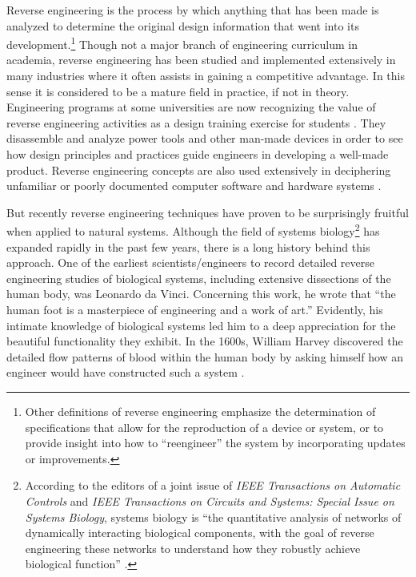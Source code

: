Reverse engineering is the process by which anything that has been made
is analyzed to determine the original design information that went into
its development.\footnote{%
Other definitions of reverse engineering emphasize
the determination of specifications that allow for the reproduction of
a device or system, or to provide insight into how to “reengineer” the
system by incorporating updates or improvements.
} Though not a major branch of
engineering curriculum in academia, reverse engineering has been
studied and implemented extensively in many industries where it often
assists in gaining a competitive advantage. In this sense it is
considered to be a mature field in practice, if not in theory.
Engineering programs at some universities are now recognizing the value
of reverse engineering activities as a design training exercise for
students \citep[][pp. 57--59]{wu2008}.
They disassemble and analyze power tools
and other man-made devices in order to see how design principles and
practices guide engineers in developing a well-made product. Reverse
engineering concepts are also used extensively in deciphering
unfamiliar or poorly documented computer software and hardware
systems \citep{eilam2005}.

But recently reverse engineering techniques have proven to be
surprisingly fruitful when applied to natural systems. Although the
field of systems biology\footnote{%
According to the editors of a joint issue of
\textit{IEEE Transactions on Automatic Controls} and \textit{IEEE
Transactions on Circuits and Systems: Special Issue on Systems Biology}, 
systems biology is “the quantitative analysis of
networks of dynamically interacting biological components, with the
goal of reverse engineering these networks to understand how they
robustly achieve biological function” .
} has expanded rapidly in
the past few years, there is a long history behind this approach. One
of the earliest scientists/engineers to record detailed reverse
engineering studies of biological systems, including extensive
dissections of the human body, was Leonardo da Vinci. Concerning this
work, he wrote that “the human foot is a masterpiece of engineering and
a work of art.”  Evidently, his intimate knowledge of biological systems
led him to a deep appreciation for the beautiful functionality they
exhibit. In the 1600s, William Harvey discovered the detailed flow
patterns of blood within the human body by asking himself how an
engineer would have constructed such a system \citep{auffraynoble2009}.

